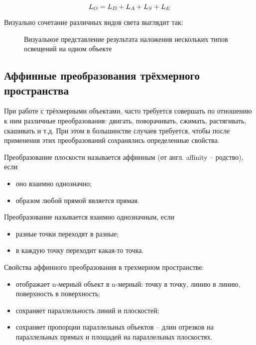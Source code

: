 \begin{equation}
	\fontsize{17}{20}{L_{O} = L_{D} + L_{A} + L_{S} + L_{E}}
	\label{form4:equation}
\end{equation}

Визуально сочетание различных видов света выглядит так:

\begin{figure}[H]
	\caption{Визуальное представление результата наложения нескольких типов освещений на одном объекте}
	\label{diagram11:image}
\end{figure}

\subsection{Аффинные преобразования трёхмерного пространства}

При работе с трёхмерными объектами, часто требуется совершать по отношению к ним различные преобразования: двигать, поворачивать, сжимать, растягивать, скашивать и т.д. При этом в большинстве случаев требуется, чтобы после применения этих преобразований сохранялись определенные свойства.

Преобразование плоскости называется аффинным (от англ. affinity – родство), если
\begin{itemize}
	\item оно взаимно однозначно;
	\item образом любой прямой является прямая.
\end{itemize}

Преобразование называется взаимно однозначным, если
\begin{itemize}
	\item разные точки переходят в разные;
	\item в каждую точку переходит какая-то точка.
\end{itemize}

Свойства аффинного преобразования в трехмерном пространстве:
\begin{itemize}
	\item отображает n-мерный объект в n-мерный: точку в точку, линию в линию, поверхность в поверхность;
	\item сохраняет параллельность линий и плоскостей;
	\item сохраняет пропорции параллельных объектов – длин отрезков на параллельных прямых и площадей на параллельных плоскостях.
\end{itemize}

